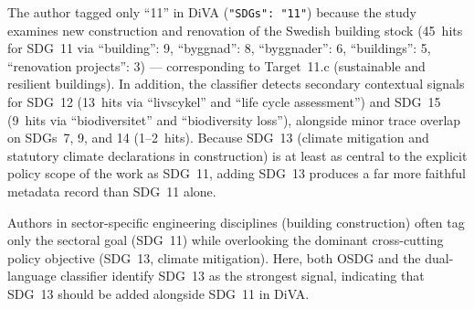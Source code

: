 \begin{casestudySection}
The author tagged only \enquote{11} in \gls{DiVA} (\texttt{"SDGs": "11"}) because the study examines new construction and renovation of the Swedish building stock (\num{45}~hits for \gls{SDG}~11 via \enquote{building}: 9, \enquote{\foreignlanguage{swedish}{byggnad}}: 8, \enquote{\foreignlanguage{swedish}{byggnader}}: 6, \enquote{buildings}: 5, \enquote{renovation projects}: 3) --- corresponding to Target~11.c (sustainable and resilient buildings). In addition, the classifier detects secondary contextual signals for \gls{SDG}~12 (\num{13}~hits via \enquote{\foreignlanguage{swedish}{livscykel}} and \enquote{life cycle assessment}) and \gls{SDG}~15 (\num{9}~hits via \enquote{\foreignlanguage{swedish}{biodiversitet}} and \enquote{biodiversity loss}), alongside minor trace overlap on \glspl{SDG}~7, 9, and 14 (\num{1}--\num{2}~hits). Because \gls{SDG}~13 (climate mitigation and statutory climate declarations in construction) is at least as central to the explicit policy scope of the work as \gls{SDG}~11, adding \gls{SDG}~13 produces a far more faithful metadata record than \gls{SDG}~11 alone.
\end{casestudySection}

\begin{takeaway}
Authors in sector-specific engineering disciplines (\eg building construction) often tag only the sectoral goal (\gls{SDG}~11) while overlooking the dominant cross-cutting policy objective (\gls{SDG}~13, climate mitigation). Here, both OSDG and the dual-language classifier identify \gls{SDG}~13 as the strongest signal, indicating that \gls{SDG}~13 should be added alongside \gls{SDG}~11 in \gls{DiVA}.
\end{takeaway}

